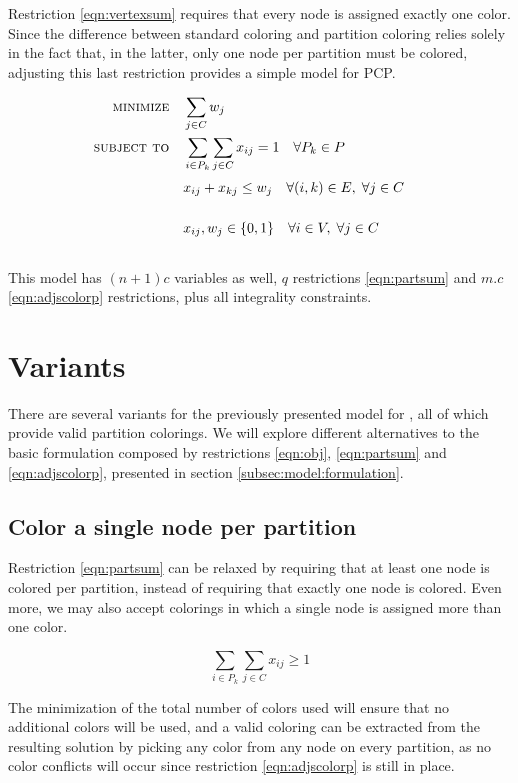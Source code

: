 Restriction \ref{eqn:vertexsum} requires that every node is assigned exactly one color. Since the difference between standard coloring and partition coloring relies solely in the fact that, in the latter, only one node per partition must be colored, adjusting this last restriction provides a simple model for PCP.

\begin{align}
\text{\textsc{minimize}} \quad & \sum_{j \in C} w_j \label{eqn:obj} \\
\text{\textsc{subject to}} \quad & \sum_{i \in P_k} \sum_{j \in C} x_{ij} = 1 \quad \forall P_k \in P \label{eqn:partsum} \\
& x_{ij} + x_{kj} \leq w_j \quad \forall (i,k) \in E, \; \forall j \in C \sumheight \label{eqn:adjscolorp}\\
& x_{ij}, w_{j} \in \{0,1\} \quad \forall i \in V, \; \forall j \in C \sumheight \nonumber
\end{align}

This model has $(n + 1) c$ variables as well, $q$ restrictions \ref{eqn:partsum} and $m.c$ \ref{eqn:adjscolorp} restrictions, plus all integrality constraints.

\section{Variants}

There are several variants for the previously presented model for \PCP{}, all of which provide valid partition colorings. We will explore different alternatives to the basic formulation composed by restrictions \ref{eqn:obj}, \ref{eqn:partsum} and \ref{eqn:adjscolorp}, presented in section \ref{subsec:model:formulation}.

\subsection{Color a single node per partition}

Restriction \ref{eqn:partsum} can be relaxed by requiring that at least one node is colored per partition, instead of requiring that exactly one node is colored. Even more, we may also accept colorings in which a single node is assigned more than one color. 

\begin{equation}
\label{eqn:partsumgeq}
\sum_{i \in P_k} \sum_{j \in C} x_{ij} \geq 1
\end{equation}

The minimization of the total number of colors used will ensure that no additional colors will be used, and a valid coloring can be extracted from the resulting solution by picking any color from any node on every partition, as no color conflicts will occur since restriction \ref{eqn:adjscolorp} is still in place.

